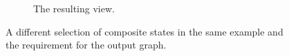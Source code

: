 \begin{figure}[H]
\begin{subfigure}[b]{0.45\textwidth}
        \caption{The resulting view.}
        \label{fig:view2}
    \end{subfigure}
    \caption{A different selection of composite states in the same example and the requirement for the output graph.}
    \label{fig:pandv}
\end{figure}